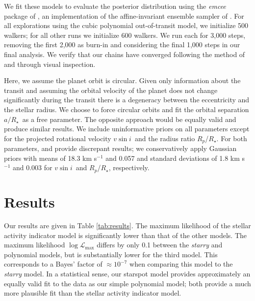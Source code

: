 \documentclass[twocolumn]{aastex63}
\newcommand{\vsini}{{$v \sin i$}}
\newcommand{\rstar}{{$R_\star$}}
\begin{document}
We fit these models to evaluate the posterior distribution using the \textit{emcee} package of \citet{Foreman-Mackey12}, an implementation of the affine-invariant ensemble sampler of \citet{Goodman10}.
For all explorations using the cubic polynomial out-of-transit model, we initialize 500 walkers; for all other runs we initialize 600 walkers. 
We run each for 3,000 steps, removing the first 2,000 as burn-in and considering the final 1,000 steps in our final analysis. 
We verify that our chains have converged following the method of \citet{Geweke92} and through visual inspection.

Here, we assume the planet orbit is circular. 
Given only information about the transit and assuming the orbital velocity of the planet does not change significantly during the transit there is a degeneracy between the eccentricity and the stellar radius. 
We choose to force circular orbits and fit the orbital separation $a/$\rstar\ as a free parameter. The opposite approach would be equally valid and produce similar results.
We include uninformative priors on all parameters except for the projected rotational velocity \vsini\ and the radius ratio $R_p$/\rstar.
For both parameters, \citet{Benatti19} and \citet{Newton19} provide discrepant results; we conservatively apply Gaussian priors with means of 18.3 km s$^{-1}$ and 0.057 and standard deviations of 1.8 km s$^{-1}$ and 0.003 for \vsini\ and $R_p$/\rstar, respectively.



\section{Results}
\label{sec:results}

Our results are given in Table \ref{tab:results}. 
The maximum likelihood of the stellar activity indicator model is significantly lower than that of the other models. 
The maximum likelihood $\log \mathcal{L}_\textrm{max}$ differs by only 0.1 between the \textit{starry} and polynomial models, but is substantially lower for the third model. 
This corresponds to a Bayes' factor of $\approx 10^{-7}$ when comparing this model to the \textit{starry} model.
In a statistical sense, our starspot model provides approximately an equally valid fit to the data as our simple polynomial model; both provide a much more plausible fit than the stellar activity indicator model.
\end{document}
